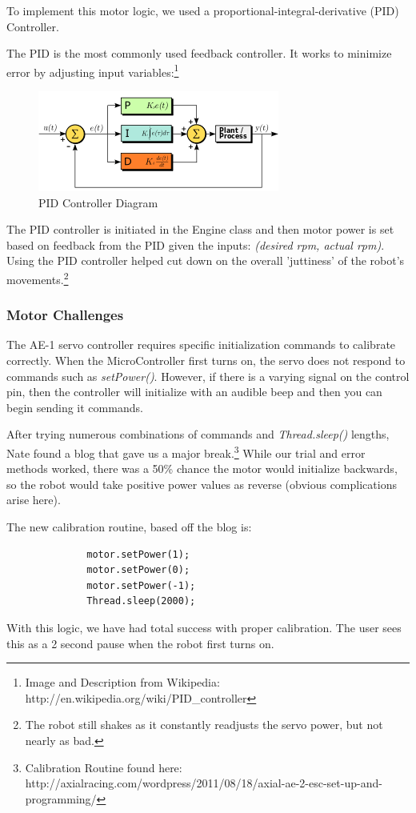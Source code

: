 \documentclass[12pt]{article}
\begin{document}
To implement this motor logic, we used a proportional-integral-derivative (PID) Controller.

The PID is the most commonly used feedback controller.  It works to minimize error by adjusting input variables:\footnote{Image and Description from Wikipedia: http://en.wikipedia.org/wiki/PID\_controller}
\begin{figure}[h]
\centerline{\includegraphics{img/PID}}
\caption{PID Controller Diagram}
\end{figure}

The PID controller is initiated in the Engine class and then motor power is set based on feedback from the PID given the inputs: \textit{(desired rpm, actual rpm)}.  Using the PID controller helped cut down on the overall 'juttiness' of the robot's movements.\footnote{The robot still shakes as it constantly readjusts the servo power, but not nearly as bad.}

\subsubsection*{Motor Challenges}
The AE-1 servo controller requires specific initialization commands to calibrate correctly.  When the MicroController first turns on, the servo does not respond to commands such as \textit{setPower()}.  However, if there is a varying signal on the control pin, then the controller will initialize with an audible beep and then you can begin sending it commands.

After trying numerous combinations of commands and \textit{Thread.sleep()} lengths, Nate found a blog that gave us a major break.\footnote{Calibration Routine found here: http://axialracing.com/wordpress/2011/08/18/axial-ae-2-esc-set-up-and-programming/}  While our trial and error methods worked, there was a 50\% chance the motor would initialize backwards, so the robot would take positive power values as reverse (obvious complications arise here).

The new calibration routine, based off the blog is:
\begin{verbatim}
              motor.setPower(1);
              motor.setPower(0);
              motor.setPower(-1);
              Thread.sleep(2000);
\end{verbatim}
With this logic, we have had total success with proper calibration.  The user sees this as a 2 second pause when the robot first turns on.
\end{document}
